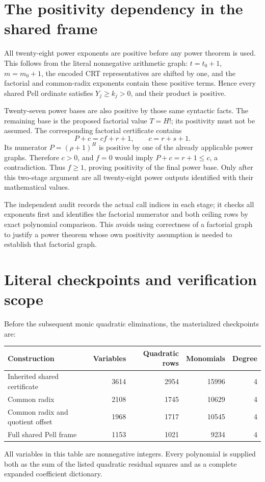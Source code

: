 \section{The positivity dependency in the shared frame}
\label{sec:positivity-order}

All twenty-eight power exponents are positive before any power theorem
is used. This follows from the literal nonnegative arithmetic graph:
$t=t_0+1$, $m=m_0+1$, the encoded CRT representatives are shifted by
one, and the factorial and common-radix exponents contain these positive
terms. Hence every shared Pell ordinate satisfies $Y_j\ge k_j>0$,
and their product is positive.

Twenty-seven power bases are also positive by those same syntactic
facts. The remaining base is the proposed factorial value $T=H!$;
its positivity must not be assumed. The corresponding factorial
certificate contains
\[
 P+c=cf+r+1,\qquad c=r+s+1.
\]
Its numerator $P=(\rho+1)^H$ is positive by one of the already
applicable power graphs. Therefore $c>0$, and $f=0$ would imply
$P+c=r+1\le c$, a contradiction. Thus $f\ge1$, proving positivity
of the final power base. Only after this two-stage argument are all
twenty-eight power outputs identified with their mathematical values.

The independent audit records the actual call indices in each stage;
it checks all exponents first and identifies the factorial numerator
and both ceiling rows by exact polynomial comparison. This avoids
using correctness of a factorial graph to justify a power theorem
whose own positivity assumption is needed to establish that factorial
graph.

\section{Literal checkpoints and verification scope}

Before the subsequent monic quadratic eliminations, the materialized
checkpoints are:
\begin{center}
\begin{tabular}{lrrrr}
\hline
Construction & Variables & Quadratic rows & Monomials & Degree\\
\hline
Inherited shared certificate & 3614 & 2954 & 15996 & 4\\
Common radix & 2108 & 1745 & 10629 & 4\\
Common radix and quotient offset & 1968 & 1717 & 10545 & 4\\
Full shared Pell frame & 1153 & 1021 & 9234 & 4\\
\hline
\end{tabular}
\end{center}
All variables in this table are nonnegative integers. Every polynomial
is supplied both as the sum of the listed quadratic residual squares
and as a complete expanded coefficient dictionary.

